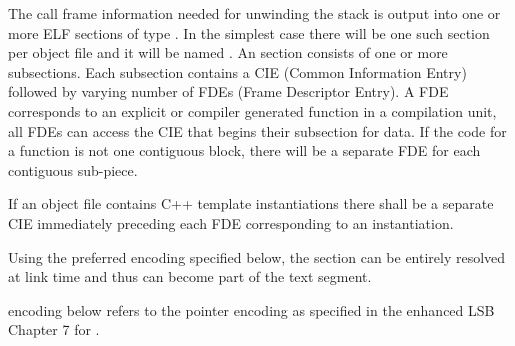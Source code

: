 The call frame information needed for unwinding the stack is output into
one or more ELF sections of type . In the simplest
case there
will be one such section per object file and it will be named
.  An  section consists of one or more
subsections. Each subsection contains a CIE (Common Information Entry)
followed by varying number of FDEs (Frame Descriptor Entry). A FDE
corresponds to an explicit or compiler generated function in a
compilation unit, all FDEs can access the CIE that begins their
subsection for data.  If the code for a function is not one contiguous
block, there will be a separate FDE for each contiguous sub-piece.

If an object file contains C++ template instantiations there shall be
a separate CIE immediately preceding each FDE corresponding to an
instantiation.

Using the preferred encoding specified below, the  section can
be entirely resolved at link time and thus can become part of the
text segment.

 encoding below refers to the pointer encoding as specified in the
enhanced LSB Chapter 7 for .

